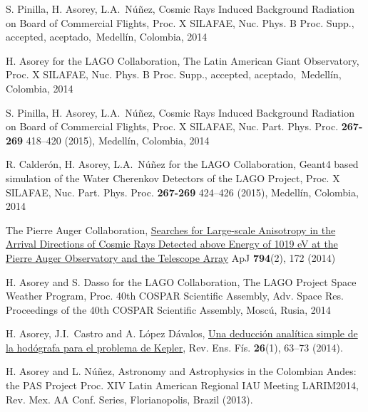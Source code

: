 \begin{etaremune}
\item {}S. Pinilla, H. Asorey, L.A.\ Núñez, {{Cosmic Rays Induced Background Radiation on Board of Commercial Flights}}, \en Proc.
X SILAFAE, Nuc.
Phys.
B Proc.
Supp., \ifeng accepted, \else aceptado,\fi\ Medellín, Colombia, 2014

\item {}H. Asorey for the LAGO Collaboration, {{The Latin American Giant Observatory}}, \en Proc.
X SILAFAE, Nuc.
Phys.
B Proc.
Supp., \ifeng accepted, \else aceptado,\fi\ Medellín, Colombia, 2014

\item {}S. Pinilla, H. Asorey, L.A.\ Núñez, {{Cosmic Rays Induced Background Radiation on Board of Commercial Flights}}, \en Proc.
X SILAFAE,  Nuc.
Part.
Phys.
Proc. {\textbf{267-269}} 418--420 (2015), Medellín, Colombia, 2014

\item {}R. Calderón, H. Asorey, L.A.\ Núñez for the LAGO Collaboration, {{Geant4 based simulation of the Water Cherenkov Detectors of the LAGO Project}}, \en Proc.
X SILAFAE, Nuc.
Part.
Phys.
Proc. {\textbf{267-269}} 424--426 (2015), Medellín, Colombia, 2014

\item {}The Pierre Auger Collaboration, \href{http://dx.doi.org/10.1088/0004-637X/794/2/172}{{Searches for Large-scale Anisotropy in the Arrival Directions of Cosmic Rays Detected above Energy of 1019 eV at the Pierre Auger Observatory and the Telescope Array}} ApJ {\textbf{794}}(2), 172 (2014)

\item {}H. Asorey and S. Dasso for the LAGO Collaboration, {{The LAGO Project Space Weather Program}}, \en Proc. 40th COSPAR Scientific Assembly, Adv. Space Res. \in Proceedings of the 40th COSPAR Scientific Assembly, Moscú, Rusia, 2014

\item {}H. Asorey, J.I.\ Castro and A. López Dávalos, \href{http://www.revistas.unc.edu.ar/index.php/revistaEF/article/view/9512}{{Una deducción analítica simple de la hodógrafa para el problema de Kepler}}, Rev. Ens. Fís. {\textbf{26}}(1), 63--73 (2014).

\item {}H. Asorey and L. Núñez, {{Astronomy and Astrophysics in the Colombian Andes: the PAS Project}} \en Proc.
XIV Latin American Regional IAU Meeting LARIM2014, Rev. Mex. AA Conf. Series, Florianopolis, Brazil (2013).


\end{etaremune}
